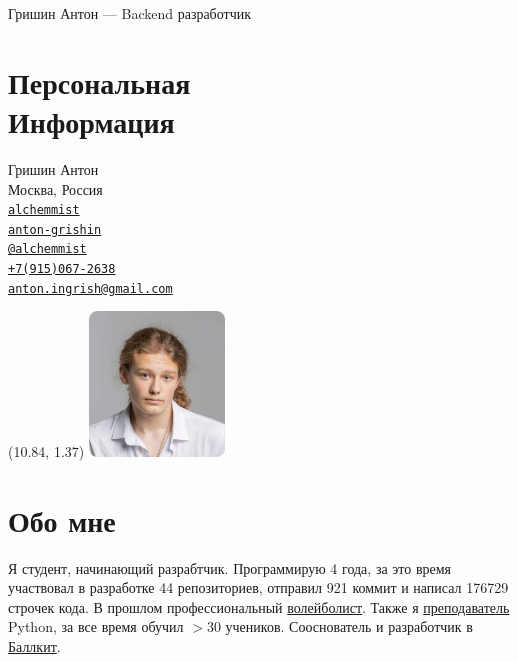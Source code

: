 \documentclass[margin,line]{resume}
\begin{document}
{\vspace*{-13mm}\sc \large Гришин Антон --- Backend разработчик} \\
\begin{resume}
  \begin{minipage}[t]{0.55\textwidth}
    \section{\mysidestyle Персональная\\Информация}
    Гришин Антон \\
    Москва, Россия \\
    \faGithub  \space
    \href{https://github.com/alchemmist/}{\texttt{alchemmist}} \\
    \faLinkedin \space
    \href{https://www.linkedin.com/in/anton-grishin-6966a8362/}{\texttt{anton-grishin}}
    \\
    \faPaperPlane \space \href{https://t.me/alchemmist}{\texttt{@alchemmist}} \\
    \faPhone \space
    \href{tel:+1234567890}{\color{blue}\texttt{+7(915)067-2638}}  \\
    \faEnvelope \space
    \href{mailto:anton.ingrish@gmail.com}{\color{blue}\texttt{anton.ingrish@gmail.com}}
  \end{minipage}

  \begin{minipage}[H]{0.18\textwidth}
    \begin{textblock}{7}(10.84, 1.37)
      \includegraphics[width=0.27\textwidth]{images/avatar.png}
    \end{textblock}
  \end{minipage}

  \vspace{-7mm}
  \section{\mysidestyle Обо мне}
  Я студент, начинающий разрабтчик. Программирую 4 года, за
  это время участвовал в разработке 44 репозиториев, отправил 921
  коммит и написал 176729 строчек кода. В прошлом профессиональный
  \href{https://github.com/alchemmist/CV/blob/main/attachments/sport.pdf}{волейболист}.
  Также я
  \href{https://www.avito.ru/moskva/predlozheniya_uslug/prepodavatel_programmirovaniya_na_python_2556461612}{преподаватель}
  Python, за все время обучил $> 30$ учеников. Сооснователь и
  разработчик в \href{https://ballkit.ru/}{Баллкит}.


\end{resume}
\end{document}
